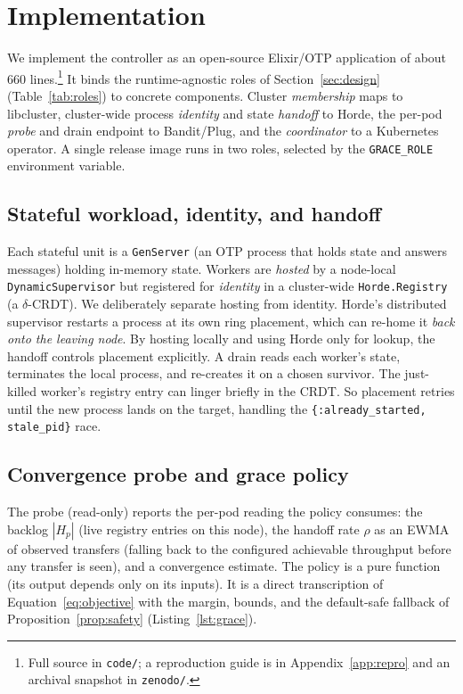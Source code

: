 \documentclass[AMA,Times1COL]{WileyNJDv5}
\begin{document}
\section{Implementation}\label{sec:impl}
We implement the controller as an open-source Elixir/OTP application of about 660 lines.\footnote{Full
source in \texttt{code/}; a reproduction guide is in Appendix~\ref{app:repro} and an archival snapshot
in \texttt{zenodo/}.} It binds the runtime-agnostic roles of Section~\ref{sec:design}
(Table~\ref{tab:roles}) to concrete components. Cluster \emph{membership} maps to libcluster,
cluster-wide process \emph{identity} and state \emph{handoff} to Horde, the per-pod \emph{probe} and
drain endpoint to Bandit/Plug, and the \emph{coordinator} to a Kubernetes operator. A single release
image runs in two roles, selected by the \texttt{GRACE\_ROLE} environment variable.

\subsection{Stateful workload, identity, and handoff}\label{sec:impl-handoff}
Each stateful unit is a \texttt{GenServer} (an OTP process that holds state and answers messages)
holding in-memory state. Workers are \emph{hosted} by a node-local \texttt{DynamicSupervisor} but
registered for \emph{identity} in a cluster-wide \texttt{Horde.Registry} (a $\delta$-CRDT). We
deliberately separate hosting from identity. Horde's distributed supervisor restarts a process at its
own ring placement, which can re-home it \emph{back onto the leaving node}. By hosting locally and using
Horde only for lookup, the handoff controls placement explicitly. A drain reads each worker's state,
terminates the local process, and re-creates it on a chosen survivor. The just-killed worker's registry
entry can linger briefly in the CRDT. So placement retries until the new process lands on the target,
handling the \texttt{\{:already\_started, stale\_pid\}} race.

\subsection{Convergence probe and grace policy}\label{sec:impl-policy}
The probe (read-only) reports the per-pod reading the policy consumes: the backlog $|H_p|$ (live
registry entries on this node), the handoff rate $\rho$ as an EWMA of observed transfers (falling back
to the configured achievable throughput before any transfer is seen), and a convergence estimate. The
policy is a pure function (its output depends only on its inputs). It is a direct transcription of
Equation~\eqref{eq:objective} with the margin, bounds, and the default-safe fallback of
Proposition~\ref{prop:safety} (Listing~\ref{lst:grace}).
\end{document}
